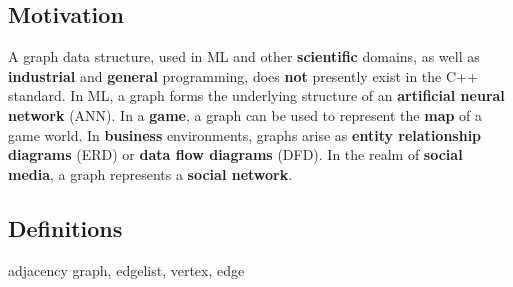 \documentclass[10pt,onecolumn]{article}
\begin{document}
\subsection{Motivation}
A graph data structure, used in ML and other \textbf{scientific} domains, as well as \textbf{industrial} and \textbf{general} programming, does \textbf{not} presently exist in the C++ standard. In ML, a graph forms the underlying structure of an \textbf{artificial neural network} (ANN). In a \textbf{game}, a graph can be used to
represent the \textbf{map} of a game world. In \textbf{business} environments, graphs arise as \textbf{entity relationship diagrams} (ERD) or \textbf{data flow diagrams} (DFD). In the realm of \textbf{social media}, a graph represents a \textbf{social network}.

\subsection{Definitions}
adjacency graph, edgelist, vertex, edge
\end{document}
